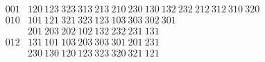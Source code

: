 \begin{equation}
\label{eq:path232-cycles}
\begin{array}{c|l}
001&120\ 123\ 323\ 313\ 213\ 210\ 230\ 130\ 132\ 232\ 212\ 312\ 310\ 320\\[2pt]
010&101\ 121\ 321\ 323\ 123\ 103\ 303\ 302\ 301\\
   &201\ 203\ 202\ 102\ 132\ 232\ 231\ 131\\[2pt]
012&131\ 101\ 103\ 203\ 303\ 301\ 201\ 231\\
   &230\ 130\ 120\ 123\ 323\ 320\ 321\ 121
\end{array}
\end{equation}
